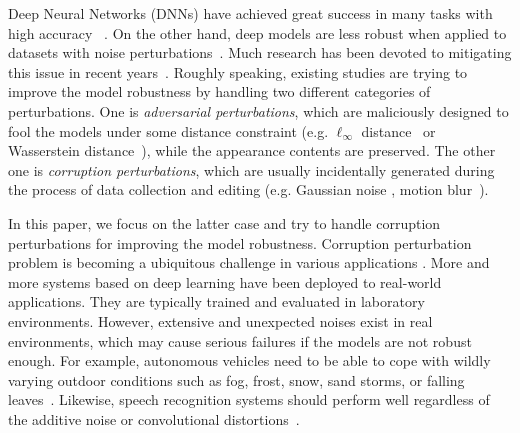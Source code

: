 \documentclass[letterpaper]{article} %
\begin{document}
Deep Neural Networks (DNNs) have achieved great success in many tasks with high accuracy ~\cite{krizhevsky2012imagenet, he2015delving, sutskever2014sequence,silver2017mastering}. On the other hand, deep models are less robust when applied to datasets with noise perturbations~\cite{szegedy2013intriguing, alzantot2018generating, hendrycks2019robustness}. Much research has been devoted to mitigating this issue in recent years~\cite{geirhos2018imagenet, rusak2020increasing, tramer2020adaptive, hendrycks2019using, mao2019metric, hendrycks2019augmix, zhang2019making}. Roughly speaking, existing studies are trying to improve the model robustness by handling two different categories of perturbations. One is \textit{adversarial perturbations}, which are maliciously designed to fool the models under some distance constraint (e.g. $\ell_{\infty}$ distance~\cite{madry2017towards} or Wasserstein distance~\cite{wong2019wasserstein}), while the appearance contents are preserved. The other one is \textit{corruption perturbations}, which are usually incidentally generated during the process of data collection and editing (e.g. Gaussian noise \cite{chapelle2001vicinal}, motion blur~\cite{hendrycks2019robustness}).

In this paper, we focus on the latter case and try to handle corruption perturbations for improving the model robustness. Corruption perturbation problem is becoming a ubiquitous challenge in various applications \cite{hendrycks2019robustness, michaelis2019benchmarking}. 
More and more systems based on deep learning have been deployed to real-world applications. They are typically trained and evaluated in laboratory environments. However, extensive and unexpected noises exist in real environments, which may cause serious failures if the models are not robust enough.
For example, autonomous vehicles need to be able to cope with wildly varying outdoor conditions such as fog, frost, snow, sand storms, or falling leaves~\cite{michaelis2019benchmarking}. Likewise, speech recognition systems should perform well regardless of the additive noise or convolutional distortions~\cite{qian2016very}.
\end{document}
